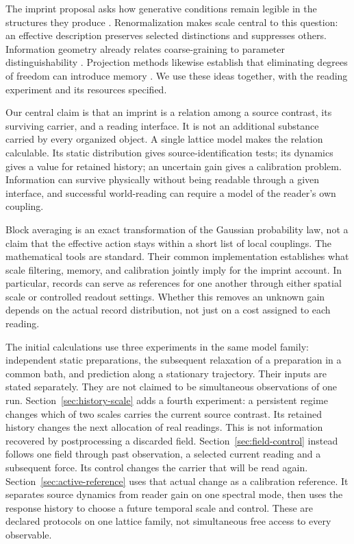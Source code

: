 \documentclass[12pt,a4paper]{article}
\begin{document}
The imprint proposal asks how generative conditions remain legible in
the structures they produce \cite{WorldImprint}. Renormalization makes
scale central to this question: an effective description preserves
selected distinctions and suppresses others. Information geometry
already relates coarse-graining to parameter distinguishability
\cite{Machta2013,Raju2018}. Projection methods likewise establish that
eliminating degrees of freedom can introduce memory \cite{Mori1965}.
We use these ideas together, with the reading experiment and its
resources specified.

Our central claim is that an imprint is a relation among a source
contrast, its surviving carrier, and a reading interface. It is not an
additional substance carried by every organized object. A single
lattice model makes the relation calculable. Its static distribution
gives source-identification tests; its dynamics gives a value for
retained history; an uncertain gain gives a calibration problem.
Information can survive physically without being readable through a
given interface, and successful world-reading can require a model of
the reader's own coupling.

Block averaging is an exact transformation of the Gaussian probability
law, not a claim that the effective action stays within a short list of
local couplings. The mathematical tools are standard. Their common
implementation establishes what scale filtering, memory, and
calibration jointly imply for the imprint account. In particular,
records can serve as references for one another through either spatial
scale or controlled readout settings. Whether this removes an unknown
gain depends on the actual record distribution, not just on a cost
assigned to each reading.

The initial calculations use three experiments in the same model family:
independent static preparations, the subsequent relaxation of a
preparation in a common bath, and prediction along a stationary
trajectory. Their inputs are stated separately. They are not claimed
to be simultaneous observations of one run.
Section~\ref{sec:history-scale} adds a fourth experiment: a persistent
regime changes which of two scales carries the current source contrast.
Its retained history changes the next allocation of real readings.
This is not information recovered by postprocessing a discarded field.
Section~\ref{sec:field-control} instead follows one field through past
observation, a selected current reading and a subsequent force. Its
control changes the carrier that will be read again.
Section~\ref{sec:active-reference} uses that actual change as a
calibration reference. It separates source dynamics from reader gain
on one spectral mode, then uses the response history to choose a
future temporal scale and control. These are declared protocols on
one lattice family, not simultaneous free access to every observable.
\end{document}
